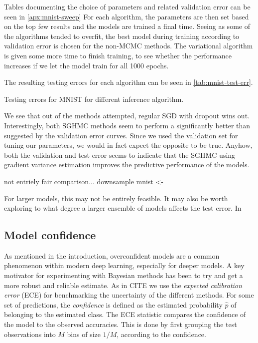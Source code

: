 Tables documenting the choice of parameters and related validation error can be seen in \cref{apx:mnist-sweep} 
For each algorithm, the parameters are then set based on the top few results and the models are trained a final time.
Seeing as some of the algorithms tended to overfit, the best model during training according to validation error is chosen for the non-MCMC methods.
The variational algorithm is given some more time to finish training, to see whether the performance increases if we let the model train for all 1000 epochs. 

The resulting testing errors for each algorithm can be seen in \cref{tab:mnist-test-err}.
\begin{table}[htbp]
    \centering
    
    \caption{Testing errors for MNIST for different inference algorithm.}
    \label{tab:mnist-test-err}
\end{table}
We see that out of the methods attempted, regular SGD with dropout wins out. 
Interestingly, both SGHMC methods seem to perform a significantly better than suggested by the validation error curves. 
Since we used the validation set for tuning our parameters, we would in fact expect the opposite to be true. 
Anyhow, both the validation and test error seems to indicate that the SGHMC using gradient variance estimation improves the predictive performance of the models.

not entriely fair comparison... downsample mnist <-

For larger models, this may not be entirely feasible.
It may also be worth exploring to what degree a larger ensemble of models affects the test error.
In

\subsection{Model confidence}

As mentioned in the introduction, overconfident models are a common phenomenon within modern deep learning, especially for deeper models. 
A key motivator for experimenting with Bayesian methods has been to try and get a more robust and reliable estimate.
As in CITE we use the \emph{expected calibration error} (ECE) for benchmarking the uncertainty of the different methods.
For some set of predictions, the \emph{confidence} is defined as the estimated probability $\hat{p}$ of belonging to the estimated class.
The ECE statistic compares the confidence of the model to the observed accuracies.
This is done by first grouping the test observations into $M$ bins of size $1/M$, according to the confidence. 

